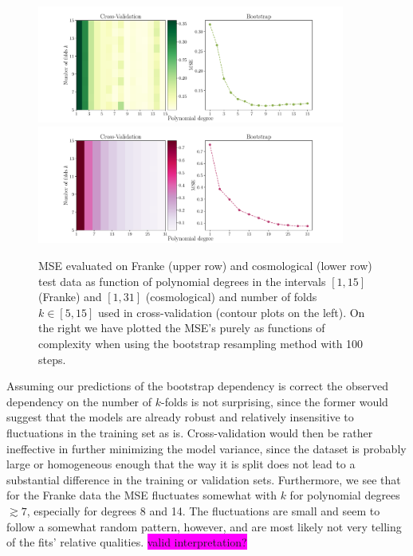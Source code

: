 \documentclass[aps,pra,english,notitlepage,reprint,nofootinbib]{revtex4-1}  %
\begin{document}
\begin{figure}
  \vspace*{-5pt}
  \centering %
  \includegraphics[trim = 0 0.8cm 0 0,clip,width=0.9\textwidth,keepaspectratio]{../figs/f_kfold_vs_bootstrap.pdf}
  \centering
  \includegraphics[width=0.9\textwidth]{../figs/g_kfold_vs_bootstrap.pdf}
  \caption{MSE evaluated on Franke (upper row) and cosmological (lower row) test data as function of polynomial degrees in the intervals $[1,15]$ (Franke) and $[1, 31]$ (cosmological) and number of folds $k\in[5, 15]$ used in cross-validation (contour plots on the left). On the right we have plotted the MSE's purely as functions of complexity when using the bootstrap resampling method with 100 steps.}\label{fig:kfold vs bootstrap}
  \vspace*{-5pt}
\end{figure}

Assuming our predictions of the bootstrap dependency is correct the observed dependency on the number of $k$-folds is not surprising, since the former would suggest that the models are already robust and relatively insensitive to fluctuations in the training set as is. Cross-validation would then be rather ineffective in further minimizing the model variance, since the dataset is probably large or homogeneous enough that the way it is split does not lead to a substantial difference in the training or validation sets. Furthermore, we see that for the Franke data the MSE fluctuates somewhat with $k$ for polynomial degrees $\gtrsim7$, especially for degrees 8 and 14. The fluctuations are small and seem to follow a somewhat random pattern, however, and are most likely not very telling of the fits' relative qualities. \colorbox{magenta}{valid interpretation?}
\end{document}

